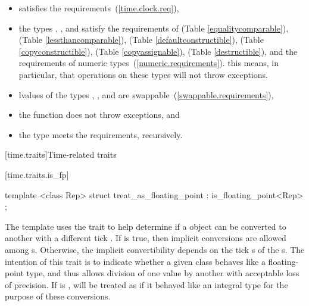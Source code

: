 \begin{itemize}
\item {} satisfies the  requirements~(\ref{time.clock.req}),

\item the types , , and 
satisfy the requirements of  (Table \ref{equalitycomparable}),
 (Table \ref{lessthancomparable}),
 (Table \ref{defaultconstructible}),
 (Table \ref{copyconstructible}),
 (Table \ref{copyassignable}),
 (Table \ref{destructible}), and the requirements of
numeric types~(\ref{numeric.requirements}). \enternote this means, in particular,
that operations on these types will not throw exceptions. \exitnote

\item lvalues of the types , , and
 are swappable~(\ref{swappable.requirements}),

\item the function  does not throw exceptions, and

\item the type  meets the 
requirements, recursively.
\end{itemize}

[time.traits]{Time-related traits}

[time.traits.is_fp]{}

%
\begin{itemdecl}
template <class Rep> struct treat_as_floating_point
  : is_floating_point<Rep> { };
\end{itemdecl}

\pnum
The  template uses the  trait to
help determine if a  object can be converted to another
 with a different tick . If
 is true, then implicit conversions
are allowed among s. Otherwise, the implicit convertibility
depends on the tick s of the s.
\enternote
The intention of this trait is to indicate whether a given class behaves like a floating-point
type, and thus allows division of one value by another with acceptable loss of precision. If
 is ,  will be treated as
if it behaved like an integral type for the purpose of these conversions.
\exitnote

